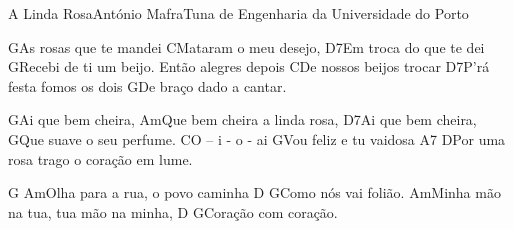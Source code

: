 \begin{musica}{A Linda Rosa}{António Mafra}{Tuna de Engenharia da Universidade do Porto}


\ac{G}{}As rosas que te mandei
\ac{C}{}Mataram o meu desejo,
\ac{D7}{}Em troca do que te dei
\ac{G}{}Recebi de ti um beijo.
Então alegres depois
\ac{C}{}De nossos beijos trocar
\ac{D7}{}P’rá festa fomos os dois
\ac{G}{}De braço dado a cantar.

\ac{G}{}Ai que bem cheira,
\ac{Am}{}Que bem cheira a linda rosa,
\ac{D7}{}Ai que bem cheira,
\ac{G}{}Que suave o seu perfume.
\ac{C}{}O – i - o - ai
\ac{G}{}Vou feliz e tu vaidosa
\ac{A7 D}{}Por uma rosa trago o coração em lume.

\ac{G Am}{}Olha para a rua, o povo caminha
\ac{D G}{}Como nós vai folião.
\ac{Am}{}Minha mão na tua, tua mão na minha,
\ac{D G}{}Coração com coração.






\end{musica}
